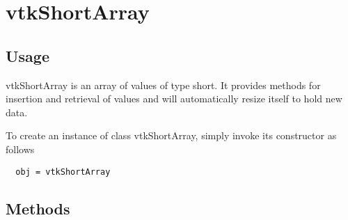 \section{vtkShortArray}

\subsection{Usage}

 vtkShortArray is an array of values of type short.  It provides
 methods for insertion and retrieval of values and will
 automatically resize itself to hold new data.

To create an instance of class vtkShortArray, simply
invoke its constructor as follows
\begin{verbatim}
  obj = vtkShortArray
\end{verbatim}
\subsection{Methods}

